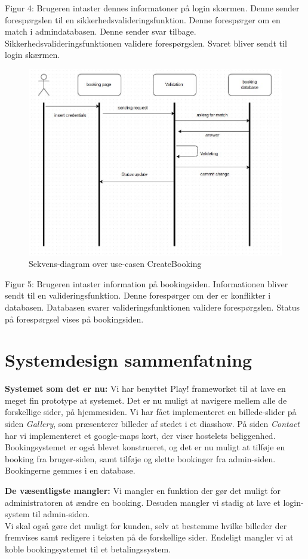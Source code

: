 \documentclass[12pt,a4paper]{article}
\begin{document}
Figur 4:
Brugeren intaster dennes informatoner på login skærmen.
Denne sender forespørgslen til en sikkerhedsvalideringsfunktion.
Denne forespørger om en match i admindatabasen.
Denne sender svar tilbage.
Sikkerhedsvalideringsfunktionen validere forespørgslen.
Svaret bliver sendt til login skærmen.
\begin{figure}[H]
\centering
\includegraphics[scale=0.6]{customerLog-in.jpg}
\caption{Sekvens-diagram over use-casen CreateBooking}
\end{figure}
Figur 5:
Brugeren intaster information på bookingsiden.
Informationen bliver sendt til en valideringsfunktion.
Denne forespørger om der er konflikter i databasen.
Databasen svarer
valideringsfunktionen validere forespørgslen.
Status på forespørgsel vises på bookingsiden.
\newpage
\section{Systemdesign sammenfatning}
\textbf{Systemet som det er nu:}
Vi har benyttet Play! frameworket til at lave en meget fin prototype at systemet.
Det er nu muligt at navigere mellem alle de forskellige sider, på hjemmesiden. Vi har fået implementeret en billede-slider på siden \textit{Gallery}, som præsenterer billeder af stedet i et diasshow. På siden \textit{Contact} har vi implementeret et google-maps kort, der viser hostelets beliggenhed. Bookingsystemet er også blevet konstrueret, og det er nu muligt at tilføje en booking fra bruger-siden, samt tilføje og slette bookinger fra admin-siden. Bookingerne gemmes i en database.    

\textbf{De væsentligste mangler:}
Vi mangler en funktion der gør det muligt for administratoren at ændre en booking. Desuden mangler vi stadig at lave et login-system til admin-siden.\\
Vi skal også gøre det muligt for kunden, selv at bestemme hvilke billeder der fremvises samt redigere i teksten på de forskellige sider. Endeligt mangler vi at koble bookingsystemet til et betalingssystem.
\end{document}
